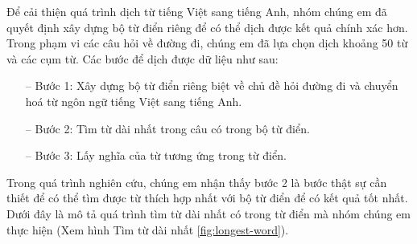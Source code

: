 Để cải thiện quá trình dịch từ tiếng Việt sang tiếng Anh, nhóm chúng em đã quyết định xây dựng bộ từ điển riêng để có thể dịch được kết quả chính xác hơn.
Trong phạm vi các câu hỏi về đường đi, chúng em đã lựa chọn dịch khoảng 50 từ và các cụm từ. Các bước để dịch được dữ liệu như sau:
\begin{itemize}
    \item[--] Bước 1: Xây dựng bộ từ điển riêng biệt về chủ đề hỏi đường đi và chuyển hoá từ ngôn ngữ tiếng Việt sang tiếng Anh.
    \item[--] Bước 2: Tìm từ dài nhất trong câu có trong bộ từ điển.
    \item[--] Bước 3: Lấy nghĩa của từ tương ứng trong từ điển.
\end{itemize}
Trong quá trình nghiên cứu, chúng em nhận thấy bước 2 là bước thật sự cần thiết để có thể tìm được từ thích hợp nhất với bộ từ điển để có kết quả tốt nhất. Dưới đây là mô tả quá trình tìm từ dài nhất có trong từ điển mà nhóm chúng em thực hiện (Xem hình Tìm từ dài nhất \ref{fig:longest-word}).
    
